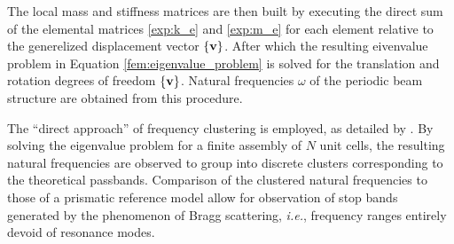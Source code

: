The local mass and stiffness matrices are then built by executing the direct sum of the elemental matrices \ref{exp:k_e} and \ref{exp:m_e} for each element relative to the generelized displacement vector $\{\mathbf{v}\}$. After which the resulting eivenvalue problem in Equation \ref{fem:eigenvalue_problem} is solved for the translation and rotation degrees of freedom $\{\mathbf{v}\}$. Natural frequencies $\omega$ of the periodic beam structure are obtained from this procedure.

The ``direct approach'' of frequency clustering is employed, as detailed by \textcite{Domagalski2021}. By solving the eigenvalue problem for a finite assembly of $N$ unit cells, the resulting natural frequencies are observed to group into discrete clusters corresponding to the theoretical passbands. Comparison of the clustered natural frequencies to those of a prismatic reference model allow for observation of stop bands generated by the phenomenon of Bragg scattering, \textit{i.e.}, frequency ranges entirely devoid of resonance modes.